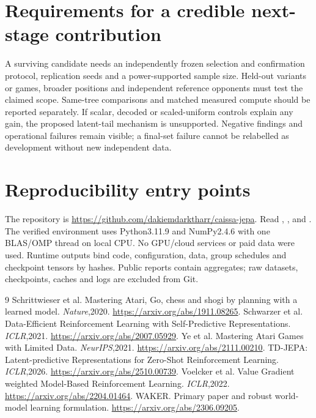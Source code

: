 \documentclass[11pt,a4paper]{article}
\begin{document}
\section{Requirements for a credible next-stage contribution}
A surviving candidate needs an independently frozen selection and confirmation
protocol, replication seeds and a power-supported sample size. Held-out variants
or games, broader positions and independent reference opponents must test the
claimed scope. Same-tree comparisons and matched measured compute should be
reported separately. If scalar, decoded or scaled-uniform controls explain any
gain, the proposed latent-tail mechanism is unsupported. Negative findings and
operational failures remain visible; a final-set failure cannot be relabelled
as development without new independent data.

\section{Reproducibility entry points}
The repository is \url{https://github.com/dakiemdarktharr/caissa-jepa}.
Read , ,  and
. The verified environment uses Python3.11.9
and NumPy2.4.6 with one BLAS/OMP thread on local CPU. No GPU/cloud services or
paid data were used. Runtime outputs bind code, configuration, data, group
schedules and checkpoint tensors by hashes. Public reports contain aggregates;
raw datasets, checkpoints, caches and logs are excluded from Git.

\begin{thebibliography}{9}\small
{} Schrittwieser et al. Mastering Atari, Go, chess and shogi by
planning with a learned model. \emph{Nature},2020.
\url{https://arxiv.org/abs/1911.08265}.
 Schwarzer et al. Data-Efficient Reinforcement Learning with
Self-Predictive Representations. \emph{ICLR},2021.
\url{https://arxiv.org/abs/2007.05929}.
 Ye et al. Mastering Atari Games with Limited Data.
\emph{NeurIPS},2021. \url{https://arxiv.org/abs/2111.00210}.
 TD-JEPA: Latent-predictive Representations for Zero-Shot
Reinforcement Learning. \emph{ICLR},2026.
\url{https://arxiv.org/abs/2510.00739}.
 Voelcker et al. Value Gradient weighted Model-Based
Reinforcement Learning. \emph{ICLR},2022.
\url{https://arxiv.org/abs/2204.01464}.
 WAKER. Primary paper and robust world-model learning formulation.
\url{https://arxiv.org/abs/2306.09205}.
\end{thebibliography}
\end{document}
